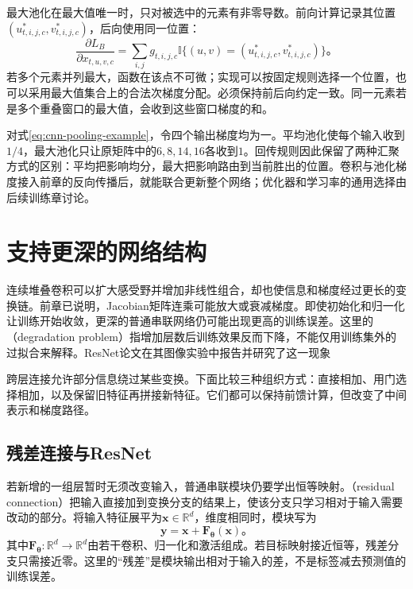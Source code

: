 最大池化在最大值唯一时，只对被选中的元素有非零导数。前向计算记录其位置$(u^*_{t,i,j,c},v^*_{t,i,j,c})$，后向使用同一位置：
\begin{equation}
  \frac{\partial L_B}{\partial x_{t,u,v,c}}
  =\sum_{i,j}g_{t,i,j,c}
       \mathbb I\{(u,v)=(u^*_{t,i,j,c},v^*_{t,i,j,c})\}\text{。}
  \label{eq:cnn-max-pooling-gradient}
\end{equation}
若多个元素并列最大，函数在该点不可微；实现可以按固定规则选择一个位置，也可以采用最大值集合上的合法次梯度分配。必须保持前后向约定一致。同一元素若是多个重叠窗口的最大值，会收到这些窗口梯度的和。

对式\eqref{eq:cnn-pooling-example}，令四个输出梯度均为一。平均池化使每个输入收到$1/4$，最大池化只让原矩阵中的$6,8,14,16$各收到$1$。回传规则因此保留了两种汇聚方式的区别：平均把影响均分，最大把影响路由到当前胜出的位置。卷积与池化梯度接入前章的反向传播后，就能联合更新整个网络；优化器和学习率的通用选择由后续训练章讨论。

\section{支持更深的网络结构}
\label{sec:cnn-deep-structures}

连续堆叠卷积可以扩大感受野并增加非线性组合，却也使信息和梯度经过更长的变换链。前章已说明，Jacobian矩阵连乘可能放大或衰减梯度。即使初始化和归一化让训练开始收敛，更深的普通串联网络仍可能出现更高的训练误差。这里的（degradation problem）指增加层数后训练效果反而下降，不能仅用训练集外的过拟合来解释。ResNet论文在其图像实验中报告并研究了这一现象

跨层连接允许部分信息绕过某些变换。下面比较三种组织方式：直接相加、用门选择相加，以及保留旧特征再拼接新特征。它们都可以保持前馈计算，但改变了中间表示和梯度路径。

\subsection{残差连接与ResNet}
\label{sec:cnn-resnet}

若新增的一组层暂时无须改变输入，普通串联模块仍要学出恒等映射。（residual connection）把输入直接加到变换分支的结果上，使该分支只学习相对于输入需要改动的部分。将输入特征展平为$\bm x\in\mathbb R^d$，维度相同时，模块写为
\begin{equation}
  \bm y=\bm x+\bm F_{\bm\theta}(\bm x)\text{。}
  \label{eq:cnn-residual-block}
\end{equation}
其中$\bm F_{\bm\theta}:\mathbb R^d\to\mathbb R^d$由若干卷积、归一化和激活组成。若目标映射接近恒等，残差分支只需接近零。这里的“残差”是模块输出相对于输入的差，不是标签减去预测值的训练误差。

